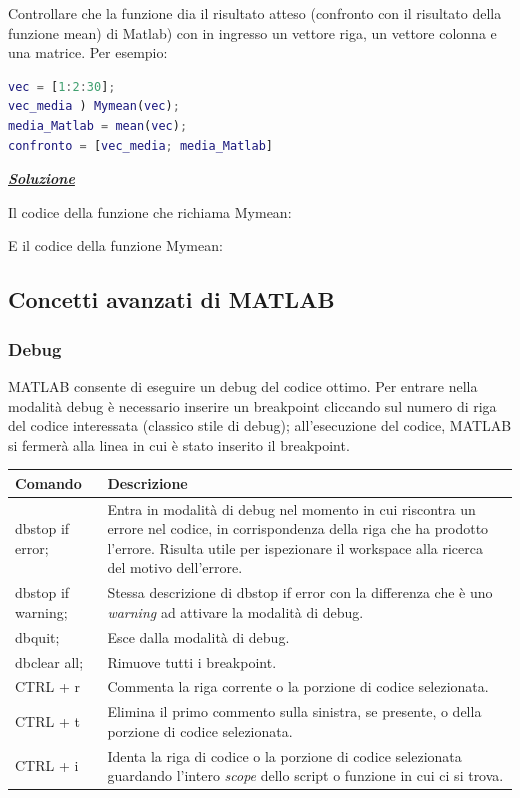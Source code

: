 \documentclass[a4paper]{article}
\begin{document}
	Controllare che la funzione dia il risultato atteso (confronto con il risultato della funzione \textsf{mean}) di Matlab) con in ingresso un vettore riga, un vettore colonna e una matrice. Per esempio:
	\begin{lstlisting}[language=MATLAB]
vec = [1:2:30];
vec_media ) Mymean(vec);
media_Matlab = mean(vec);
confronto = [vec_media; media_Matlab]\end{lstlisting}
	
	\noindent
	\textcolor{Green4}{\textbf{\underline{\emph{Soluzione}}}}\newline
	
	\noindent
	Il codice della funzione che richiama Mymean:
	
	E il codice della funzione Mymean:
	\newpage
	
	\subsection{Concetti avanzati di MATLAB}
	
	\subsubsection{Debug}
	
	MATLAB consente di eseguire un debug del codice ottimo. Per entrare nella modalità debug è necessario inserire un breakpoint cliccando sul numero di riga del codice interessata (classico stile di debug); all'esecuzione del codice, MATLAB si fermerà alla linea in cui è stato inserito il breakpoint.
	
	\begin{table}[!htbp]
		\centering
		\begin{tabular}{@{} l p{24em} @{}}
			\toprule
			Comando	& Descrizione \\
			\midrule
			\textsf{dbstop if error;}	& Entra in modalità di debug nel momento in cui riscontra un errore nel codice, in corrispondenza della riga che ha prodotto l'errore. Risulta utile per ispezionare il workspace alla ricerca del motivo dell'errore. \\
			\textsf{dbstop if warning;}	& Stessa descrizione di \textsf{dbstop if error} con la differenza che è uno \emph{warning} ad attivare la modalità di debug. \\
			\textsf{dbquit;}			& Esce dalla modalità di debug. \\
			\textsf{dbclear all;}		& Rimuove tutti i breakpoint. \\
			CTRL + r					& Commenta la riga corrente o la porzione di codice selezionata. \\
			CTRL + t					& Elimina il primo commento sulla sinistra, se presente, o della porzione di codice selezionata. \\
			CTRL + i					& Identa la riga di codice o la porzione di codice selezionata guardando l'intero \emph{scope} dello script o funzione in cui ci si trova. \\
			\bottomrule
		\end{tabular}
	\end{table}\newpage
	
\end{document}
